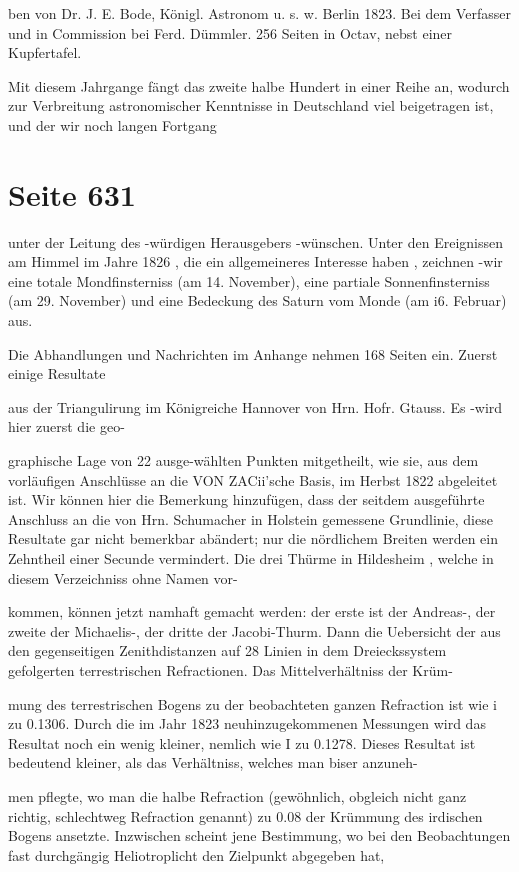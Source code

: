 \documentclass[10pt,a4paper]{article}
\begin{document}
ben von Dr. J. E. Bode, Königl. Astronom u. s. w. Berlin 1823. Bei dem Verfasser und in Commission bei Ferd. Dümmler. 256 Seiten in Octav, nebst einer Kupfertafel.

Mit diesem Jahrgange fängt das zweite halbe Hundert in einer Reihe an, wodurch zur Verbreitung astronomischer Kenntnisse in Deutschland viel beigetragen ist, und der wir noch langen Fortgang


\newpage
\section*{Seite 631}
unter der Leitung des -würdigen Herausgebers -wünschen. Unter den Ereignissen am Himmel im Jahre 1826 , die ein allgemeineres Interesse haben , zeichnen -wir eine totale Mondfinsterniss (am 14. November), eine partiale Sonnenfinsterniss (am 29. November) und eine Bedeckung des Saturn vom Monde (am i6. Februar) aus.

Die Abhandlungen und Nachrichten im Anhange nehmen 168 Seiten ein. Zuerst einige Resultate

aus der Triangulirung im Königreiche Hannover von Hrn. Hofr. Gtauss. Es -wird hier zuerst die geo-

graphische Lage von 22 ausge-wählten Punkten mitgetheilt, wie sie, aus dem vorläufigen Anschlüsse an die VON ZACii'sche Basis, im Herbst 1822 abgeleitet ist. Wir können hier die Bemerkung hinzufügen, dass der seitdem ausgeführte Anschluss an die von Hrn. Schumacher in Holstein gemessene Grundlinie, diese Resultate gar nicht bemerkbar abändert; nur die nördlichem Breiten werden ein Zehntheil einer Secunde vermindert. Die drei Thürme in Hildesheim , welche in diesem Verzeichniss ohne Namen vor-

kommen, können jetzt namhaft gemacht werden: der erste ist der Andreas-, der zweite der Michaelis-, der dritte der Jacobi-Thurm. Dann die Uebersicht der aus den gegenseitigen Zenithdistanzen auf 28 Linien in dem Dreieckssystem gefolgerten terrestrischen Refractionen. Das Mittelverhältniss der Krüm-

mung des terrestrischen Bogens zu der beobachteten ganzen Refraction ist wie i zu 0.1306. Durch die im Jahr 1823 neuhinzugekommenen Messungen wird das Resultat noch ein wenig kleiner, nemlich wie I zu 0.1278. Dieses Resultat ist bedeutend kleiner, als das Verhältniss, welches man biser anzuneh-

men pflegte, wo man die halbe Refraction (gewöhnlich, obgleich nicht ganz richtig, schlechtweg Refraction genannt) zu 0.08 der Krümmung des irdischen Bogens ansetzte. Inzwischen scheint jene Bestimmung, wo bei den Beobachtungen fast durchgängig Heliotroplicht den Zielpunkt abgegeben hat,
\end{document}
